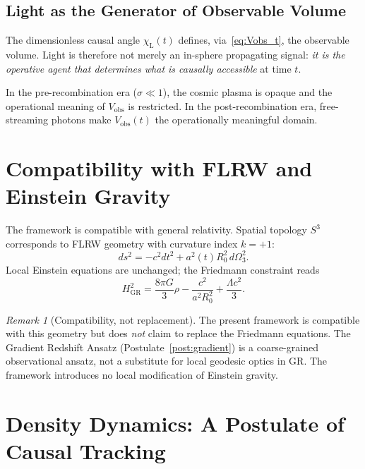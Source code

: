 \documentclass[12pt,a4paper]{amsart}
\theoremstyle{plain}
\theoremstyle{definition}
\theoremstyle{remark}
\newtheorem{remark}[theorem]{Remark}
\newcommand{\Sthree}{S^3}
\newcommand{\Lam}{\ensuremath{\Lambda}}
\newcommand{\Vobs}{V_{\mathrm{obs}}}
\newcommand{\chiL}{\chi_{\mathrm{L}}}
\begin{document}
\subsection{Light as the Generator of Observable Volume}

The dimensionless causal angle $\chiL(t)$ defines, via~\eqref{eq:Vobs_t},
the observable volume. Light is therefore not merely an in-sphere
propagating signal: \emph{it is the operative agent that determines
what is causally accessible} at time $t$.

In the pre-recombination era ($\sigma\ll 1$), the cosmic plasma is
opaque and the operational meaning of $\Vobs$ is restricted. In the
post-recombination era, free-streaming photons make $\Vobs(t)$ the
operationally meaningful domain.



\section{Compatibility with FLRW and Einstein Gravity}
\label{sec:flrw}

The framework is compatible with general relativity. Spatial topology
$\Sthree$ corresponds to FLRW geometry with curvature index $k=+1$:
\begin{equation}
  ds^2 = -c^2dt^2 + a^2(t)R_0^2\,d\Omega_3^2.
  \label{eq:flrw_metric}
\end{equation}
Local Einstein equations are unchanged; the Friedmann constraint reads
\begin{equation}
  H_{\mathrm{GR}}^2 = \frac{8\pi G}{3}\rho - \frac{c^2}{a^2 R_0^2}
    + \frac{\Lam c^2}{3}.
  \label{eq:friedmann}
\end{equation}

\begin{remark}[Compatibility, not replacement]
  The present framework is compatible with this geometry but does
  \emph{not} claim to replace the Friedmann equations. The Gradient
  Redshift Ansatz (Postulate~\ref{post:gradient}) is a coarse-grained
  observational ansatz, not a substitute for local geodesic optics
  in GR. The framework introduces no local modification of Einstein
  gravity.
\end{remark}

\section{Density Dynamics: A Postulate of Causal Tracking}
\label{sec:density}
\end{document}

